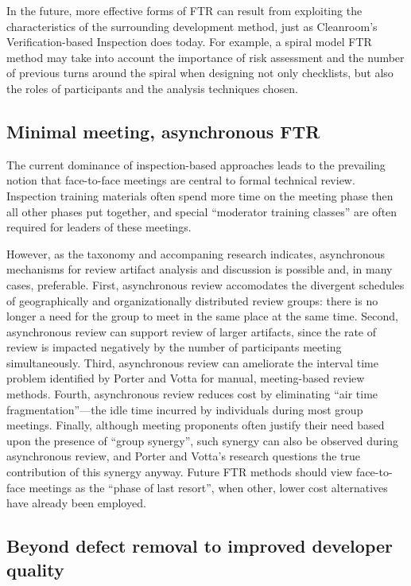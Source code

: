 In the future, more effective forms of FTR can result from exploiting the
characteristics of the surrounding development method, just as Cleanroom's
Verification-based Inspection does today.  For example, a spiral model FTR
method may take into account the importance of risk assessment and the
number of previous turns around the spiral when designing not only
checklists, but also the roles of participants and the analysis techniques
chosen.

\subsection*{Minimal meeting, asynchronous FTR}

The current dominance of inspection-based approaches leads to the
prevailing notion that face-to-face meetings are central to formal
technical review.  Inspection training materials often spend more time on
the meeting phase then all other phases put together, and special
``moderator training classes'' are often required for leaders of these
meetings.  

However, as the taxonomy and accompaning research indicates, asynchronous
mechanisms for review artifact analysis and discussion is possible and, in
many cases, preferable.  First, asynchronous review accomodates the
divergent schedules of geographically and organizationally distributed
review groups: there is no longer a need for the group to meet in the same
place at the same time. Second, asynchronous review can support review of
larger artifacts, since the rate of review is impacted negatively by the
number of participants meeting simultaneously.  Third, asynchronous review
can ameliorate the interval time problem identified by Porter and Votta for
manual, meeting-based review methods.  Fourth, asynchronous review reduces
cost by eliminating ``air time fragmentation''---the idle time incurred by
individuals during most group meetings.  Finally, although meeting
proponents often justify their need based upon the presence of ``group
synergy'', such synergy can also be observed during asynchronous review,
and Porter and Votta's research questions the true contribution of this
synergy anyway.  Future FTR methods should view face-to-face meetings as the
``phase of last resort'', when other, lower cost alternatives have already
been employed.


\subsection*{Beyond defect removal to improved developer quality}

